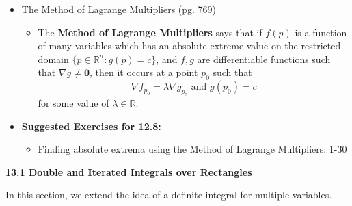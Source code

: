 \documentclass[12pt]{article}
\theoremstyle{plain}
\theoremstyle{definition}
\theoremstyle{remark}
\newcommand{\vect}[1]{\mathbf{#1}}
\begin{document}
	\begin{itemize}
	
	\item The Method of Lagrange Multipliers (pg. 769)
	
		\begin{itemize}
		\item The \textbf{Method of Lagrange Multipliers} says that if $f(p)$ is a function of many variables which has an absolute extreme value on the restricted domain $\{p\in \mathbb{R}^n:g(p)=c\}$, and $f,g$ are differentiable functions such that $\nabla g \not= \vect{0}$, then it occurs at a point $p_0$ such that \[\nabla f_{p_0}=\lambda \nabla g_{p_0} \text{ and } g(p_0)=c\] for some value of $\lambda\in\mathbb{R}$.
		\end{itemize}
		
	\item \textbf{Suggested Exercises for 12.8:}
	
		\begin{itemize}
		\item Finding absolute extrema using the Method of Lagrange Multipliers: 1-30
		\end{itemize}
		
	\end{itemize}
	
	\newpage
	
	\centerline{\bf 13.1 Double and Iterated Integrals over Rectangles}
	
	In this section, we extend the idea of a definite integral for multiple variables.
	
\end{document}

